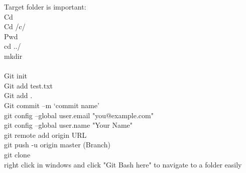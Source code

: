 \documentclass[12pt]{article}
\begin{document}
Target folder is important:\\
Cd\\
Cd /c/\\
Pwd\\
cd ../\\
mkdir\\
\\
Git init\\
Git add test.txt\\
Git add .\\
Git commit –m ‘commit name’\\
git config --global user.email "you@example.com"\\
git config --global user.name "Your Name"\\
git remote add origin URL\\
git push -u origin master (Branch)\\
git clone\\
right click in windows and click "Git Bash here" to navigate to a folder easily\\
\end{document}
